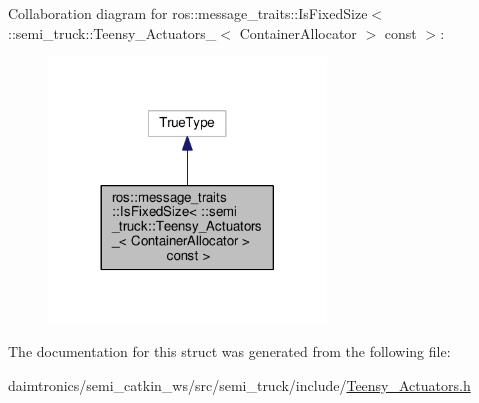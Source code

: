 Collaboration diagram for ros\+:\+:message\+\_\+traits\+:\+:Is\+Fixed\+Size$<$ \+:\+:semi\+\_\+truck\+:\+:Teensy\+\_\+\+Actuators\+\_\+$<$ Container\+Allocator $>$ const $>$\+:\nopagebreak
\begin{figure}[H]
\begin{center}
\leavevmode
\includegraphics[width=209pt]{structros_1_1message__traits_1_1_is_fixed_size_3_01_1_1semi__truck_1_1_teensy___actuators___3_01549018ee433734dfb23afefae8aebc19}
\end{center}
\end{figure}


The documentation for this struct was generated from the following file\+:\begin{DoxyCompactItemize}
\item 
daimtronics/semi\+\_\+catkin\+\_\+ws/src/semi\+\_\+truck/include/\hyperlink{_teensy___actuators_8h}{Teensy\+\_\+\+Actuators.\+h}\end{DoxyCompactItemize}
